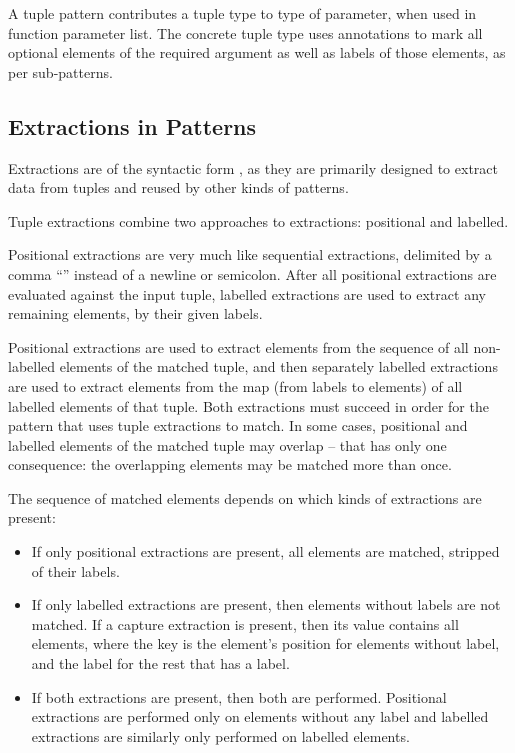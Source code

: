 A tuple pattern contributes a tuple type to type of parameter, when used in function parameter list. The concrete tuple type uses annotations to mark all optional elements of the required argument as well as labels of those elements, as per sub-patterns. 





\subsection{Extractions in Patterns}
\label{sec:extractions-in-patterns}

Extractions are of the syntactic form , as they are primarily designed to extract data from tuples and reused by other kinds of patterns. 

Tuple extractions combine two approaches to extractions: positional and labelled. 

Positional extractions are very much like sequential extractions, delimited by a comma ``\code{,}'' instead of a newline or semicolon. After all positional extractions are evaluated against the input tuple, labelled extractions are used to extract any remaining elements, by their given labels. 

Positional extractions are used to extract elements from the sequence of all non-labelled elements of the matched tuple, and then separately labelled extractions are used to extract elements from the map (from labels to elements) of all labelled elements of that tuple. Both extractions must succeed in order for the pattern that uses tuple extractions to match. In some cases, positional and labelled elements of the matched tuple may overlap -- that has only one consequence: the overlapping elements may be matched more than once. 

The sequence of matched elements depends on which kinds of extractions are present:
\begin{itemize}
  \item If only positional extractions are present, all elements are matched, stripped of their labels. 
  \item If only labelled extractions are present, then elements without labels are not matched. If a capture extraction is present, then its value contains all elements, where the key is the element's position for elements without label, and the label for the rest that has a label. 
  \item If both extractions are present, then both are performed. Positional extractions are performed only on elements without any label and labelled extractions are similarly only performed on labelled elements. 
\end{itemize}





